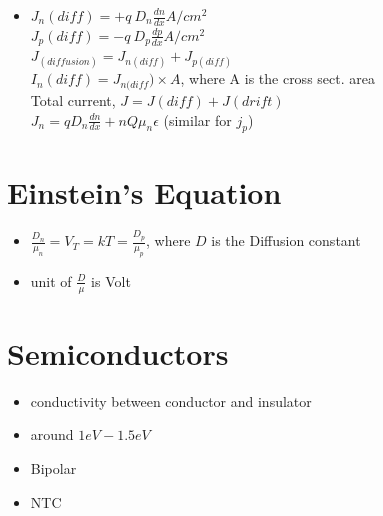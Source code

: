 \documentclass[10pt, a4paper]{report}
\begin{document}
\begin{itemize}
  	 	 \item $ J_n(diff) = +q\:D_n\frac{dn}{dx}  A/cm^2$\\$ J_p(diff) = -q\:D_p\frac{dp}{dx}  A/cm^2$ \\
  	 	 $ J_{(diffusion)} = J_{n(diff)} + J_{p(diff)} $ \\
  	 	 $ I_n(diff) = J_{n(diff}) \times A $, where A is the cross sect. area\\
  	 	 Total current, $ J = J(diff) + J(drift) $ \\
   	 	 $ J_n = qD_n\frac{dn}{dx} + nQ\mu_n \epsilon $ (similar for $ j_p $)
	\end{itemize}
	\section{Einstein's Equation}
	\begin{itemize}
		\item $ \frac{D_n}{\mu_n} = V_T = kT = \frac{D_p}{\mu_p} $, where $ D $ is the Diffusion constant
		\item unit of $\frac{D}{\mu}$ is Volt
	\end{itemize}
	\section{Semiconductors}
\begin{itemize}
	\item conductivity between conductor and insulator
	\item around $ 1eV-1.5eV $
	\item Bipolar
	\item NTC
\end{itemize}
\end{document}
